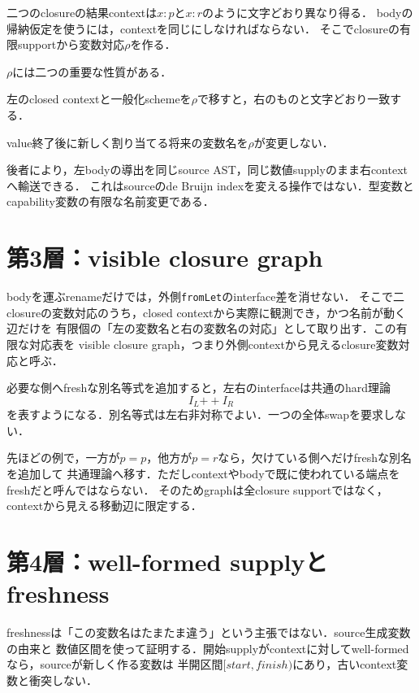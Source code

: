 \documentclass[11pt,a4paper,oneside]{ltjsbook}
\newcommand{\code}[1]{\texttt{#1}}
\begin{document}
二つのclosureの結果contextは$x:p$と$x:r$のように文字どおり異なり得る．
bodyの帰納仮定を使うには，contextを同じにしなければならない．
そこでclosureの有限supportから変数対応$\rho$を作る．

$\rho$には二つの重要な性質がある．

\begin{description}[leftmargin=9em,style=nextline]
  \item[bodyContext\_exact]
    左のclosed contextと一般化schemeを$\rho$で移すと，右のものと文字どおり一致する．
  \item[FixesAtOrAbove]
    value終了後に新しく割り当てる将来の変数名を$\rho$が変更しない．
\end{description}

後者により，左bodyの導出を同じsource AST，同じ数値supplyのまま右contextへ輸送できる．
これはsourceのde Bruijn indexを変える操作ではない．型変数とcapability変数の有限な名前変更である．

\section{第3層：visible closure graph}

bodyを運ぶrenameだけでは，外側\code{fromLet}のinterface差を消せない．
そこで二closureの変数対応のうち，closed contextから実際に観測でき，かつ名前が動く辺だけを
有限個の「左の変数名と右の変数名の対応」として取り出す．この有限な対応表を
visible closure graph，つまり外側contextから見えるclosure変数対応と呼ぶ．

必要な側へfreshな別名等式を追加すると，左右のinterfaceは共通のhard理論
\[
  I_L\mathbin{+\!+}I_R
\]
を表すようになる．別名等式は左右非対称でよい．一つの全体swapを要求しない．

先ほどの例で，一方が$p=p$，他方が$p=r$なら，欠けている側へだけfreshな別名を追加して
共通理論へ移す．ただしcontextやbodyで既に使われている端点をfreshだと呼んではならない．
そのためgraphは全closure supportではなく，contextから見える移動辺に限定する．

\section{第4層：well-formed supplyとfreshness}

freshnessは「この変数名はたまたま違う」という主張ではない．source生成変数の由来と
数値区間を使って証明する．開始supplyがcontextに対してwell-formedなら，sourceが新しく作る変数は
半開区間$[\mathit{start},\mathit{finish})$にあり，古いcontext変数と衝突しない．
\end{document}
